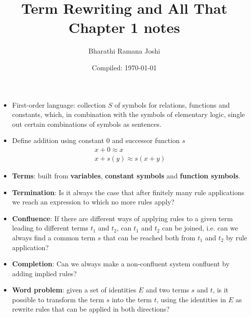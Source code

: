\documentclass[titlepage, 12pt]{article}
\begin{document}
\title{Term Rewriting and All That\\Chapter 1 notes}

\author{Bharathi Ramana Joshi}

\date{Compiled: \today}

\newpage

\begin{itemize}

  \item First-order language: collection $S$ of symbols for relations, functions and
    constants, which, in combination with the symbols of elementary logic,
    single out certain combinations of symbols as sentences.

  \item Define addition using constant $0$ and successor function $s$
    \begin{gather*}
      x + 0 \approx x\\
      x + s(y) \approx s(x + y)
    \end{gather*}

  \item\textbf{Terms}: built from \textbf{variables}, \textbf{constant symbols}
    and \textbf{function symbols}.

  \item\textbf{Termination}: Is it always the case that after finitely many rule
    applications we reach an expression to which no more rules apply?

  \item\textbf{Confluence}: If there are different ways of applying rules to a
    given term leading to different terms $t_1$ and $t_2$, can $t_1$ and $t_2$
    can be joined, i.e. can we always find a common term $s$ that can be reached
    both from $t_1$ and $t_2$ by rule application?

  \item\textbf{Completion}: Can we always make a non-confluent system confluent
    by adding implied rules?

  \item\textbf{Word problem}: given a set of identities $E$ and two terms $s$
    and $t$, is it possible to transform the term $s$ into the term $t$, using
    the identities in $E$ as rewrite rules that can be applied in both
    directions?

\end{itemize}
\end{document}
